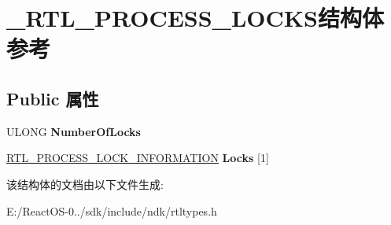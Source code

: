\hypertarget{struct___r_t_l___p_r_o_c_e_s_s___l_o_c_k_s}{}\section{\+\_\+\+R\+T\+L\+\_\+\+P\+R\+O\+C\+E\+S\+S\+\_\+\+L\+O\+C\+K\+S结构体 参考}
\label{struct___r_t_l___p_r_o_c_e_s_s___l_o_c_k_s}
\subsection*{Public 属性}
\begin{DoxyCompactItemize}
\item 
\mbox{\label{struct___r_t_l___p_r_o_c_e_s_s___l_o_c_k_s_afed949789fe88427c8ae8b558ea33ee6}} 
U\+L\+O\+NG {\bfseries Number\+Of\+Locks}
\item 
\mbox{\label{struct___r_t_l___p_r_o_c_e_s_s___l_o_c_k_s_a2a6949fd5c206e1f456812ca13423bab}} 
\hyperlink{struct___r_t_l___p_r_o_c_e_s_s___l_o_c_k___i_n_f_o_r_m_a_t_i_o_n}{R\+T\+L\+\_\+\+P\+R\+O\+C\+E\+S\+S\+\_\+\+L\+O\+C\+K\+\_\+\+I\+N\+F\+O\+R\+M\+A\+T\+I\+ON} {\bfseries Locks} \mbox{[}1\mbox{]}
\end{DoxyCompactItemize}


该结构体的文档由以下文件生成\+:\begin{DoxyCompactItemize}
\item 
E\+:/\+React\+O\+S-\/0../sdk/include/ndk/rtltypes.\+h\end{DoxyCompactItemize}
